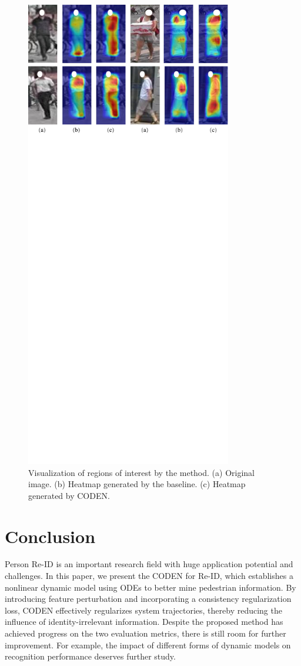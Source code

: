 \documentclass[12pt]{spieman}  %
\begin{document}
\begin{spacing}{2}
		\begin{figure}[!htbp]
			\centering
			\includegraphics[width=9cm]{Figure_4}
			\caption{Visualization of regions of interest by the method. (a) Original image. (b) Heatmap generated by the baseline. (c) Heatmap generated by CODEN.}
			\label{fig:vis_heatmap}
		\end{figure}
		
		\section{Conclusion}
		\label{section:conclusion}
		Person Re-ID is an important research field with huge application potential and challenges. In this paper, we present the CODEN for Re-ID, which establishes a nonlinear dynamic model using ODEs to better mine pedestrian information. By introducing feature perturbation and incorporating a consistency regularization loss, CODEN effectively regularizes system trajectories, thereby reducing the influence of identity-irrelevant information. Despite the proposed method has achieved  progress on the two evaluation metrics, there is still room for further improvement. For example, the impact of different forms of dynamic models on recognition performance deserves further study.
		

\end{spacing}
\end{document}
